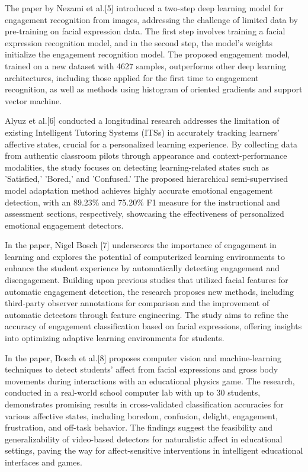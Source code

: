 \par The paper by Nezami et al.[5] introduced a two-step deep learning model for engagement recognition from images, addressing the challenge of limited data by pre-training on facial expression data. The first step involves training a facial expression recognition model, and in the second step, the model's weights initialize the engagement recognition model. The proposed engagement model, trained on a new dataset with 4627 samples, outperforms other deep learning architectures, including those applied for the first time to engagement recognition, as well as methods using histogram of oriented gradients and support vector machine.
\par Alyuz et al.[6] conducted a longitudinal research addresses the limitation of existing Intelligent Tutoring Systems (ITSs) in accurately tracking learners' affective states, crucial for a personalized learning experience. By collecting data from authentic classroom pilots through appearance and context-performance modalities, the study focuses on detecting learning-related states such as 'Satisfied,' 'Bored,' and 'Confused.' The proposed hierarchical semi-supervised model adaptation method achieves highly accurate emotional engagement detection, with an 89.23\% and 75.20\% F1 measure for the instructional and assessment sections, respectively, showcasing the effectiveness of personalized emotional engagement detectors.
\par In the paper, Nigel Bosch [7] underscores the importance of engagement in learning and explores the potential of computerized learning environments to enhance the student experience by automatically detecting engagement and disengagement. Building upon previous studies that utilized facial features for automatic engagement detection, the research proposes new methods, including third-party observer annotations for comparison and the improvement of automatic detectors through feature engineering. The study aims to refine the accuracy of engagement classification based on facial expressions, offering insights into optimizing adaptive learning environments for students.
\par In the paper, Bosch et al.[8] proposes computer vision and machine-learning techniques to detect students' affect from facial expressions and gross body movements during interactions with an educational physics game. The research, conducted in a real-world school computer lab with up to 30 students, demonstrates promising results in cross-validated classification accuracies for various affective states, including boredom, confusion, delight, engagement, frustration, and off-task behavior. The findings suggest the feasibility and generalizability of video-based detectors for naturalistic affect in educational settings, paving the way for affect-sensitive interventions in intelligent educational interfaces and games.

